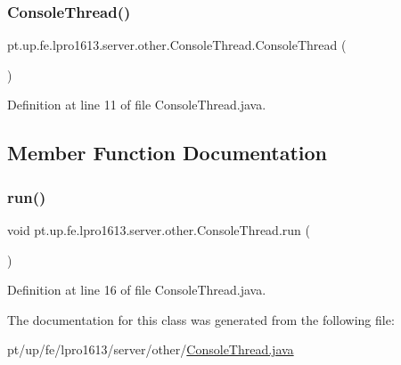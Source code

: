 \subsubsection{\texorpdfstring{Console\+Thread()}{ConsoleThread()}}
{\footnotesize\ttfamily pt.\+up.\+fe.\+lpro1613.\+server.\+other.\+Console\+Thread.\+Console\+Thread (\begin{DoxyParamCaption}{ }\end{DoxyParamCaption})}



Definition at line 11 of file Console\+Thread.\+java.



\subsection{Member Function Documentation}
\hypertarget{classpt_1_1up_1_1fe_1_1lpro1613_1_1server_1_1other_1_1_console_thread_a7740e1ce4d58dbe4cfcbf6caaa998290}{}\label{classpt_1_1up_1_1fe_1_1lpro1613_1_1server_1_1other_1_1_console_thread_a7740e1ce4d58dbe4cfcbf6caaa998290} 
\subsubsection{\texorpdfstring{run()}{run()}}
{\footnotesize\ttfamily void pt.\+up.\+fe.\+lpro1613.\+server.\+other.\+Console\+Thread.\+run (\begin{DoxyParamCaption}{ }\end{DoxyParamCaption})}



Definition at line 16 of file Console\+Thread.\+java.



The documentation for this class was generated from the following file\+:\begin{DoxyCompactItemize}
\item 
pt/up/fe/lpro1613/server/other/\hyperlink{_console_thread_8java}{Console\+Thread.\+java}\end{DoxyCompactItemize}
